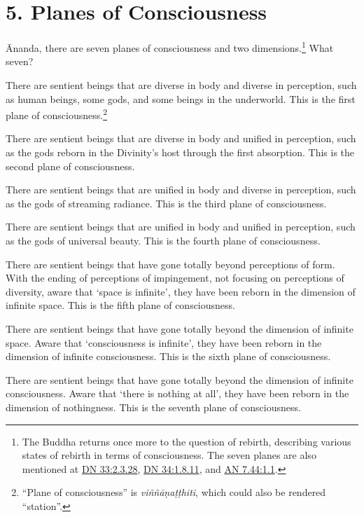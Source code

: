 \documentclass[12pt,openany]{book}%
\begin{document}
\section*{5. Planes of Consciousness }

Ānanda, there are seven planes of consciousness and two dimensions.\footnote{The Buddha returns once more to the question of rebirth, describing various states of rebirth in terms of consciousness. The seven planes are also mentioned at \href{https://suttacentral.net/dn33/en/sujato\#2.3.28}{DN 33:2.3.28}, \href{https://suttacentral.net/dn34/en/sujato\#1.8.11}{DN 34:1.8.11}, and \href{https://suttacentral.net/an7.44/en/sujato\#1.1}{AN 7.44:1.1}. } What seven? 

There are sentient beings that are diverse in body and diverse in perception, such as human beings, some gods, and some beings in the underworld. This is the first plane of consciousness.\footnote{“Plane of consciousness” is \textit{\textsanskrit{viññāṇaṭṭhiti}}, which could also be rendered “station”. } 

There are sentient beings that are diverse in body and unified in perception, such as the gods reborn in the Divinity’s host through the first absorption. This is the second plane of consciousness. 

There are sentient beings that are unified in body and diverse in perception, such as the gods of streaming radiance. This is the third plane of consciousness. 

There are sentient beings that are unified in body and unified in perception, such as the gods of universal beauty. This is the fourth plane of consciousness. 

There are sentient beings that have gone totally beyond perceptions of form. With the ending of perceptions of impingement, not focusing on perceptions of diversity, aware that ‘space is infinite’, they have been reborn in the dimension of infinite space. This is the fifth plane of consciousness. 

There are sentient beings that have gone totally beyond the dimension of infinite space. Aware that ‘consciousness is infinite’, they have been reborn in the dimension of infinite consciousness. This is the sixth plane of consciousness. 

There are sentient beings that have gone totally beyond the dimension of infinite consciousness. Aware that ‘there is nothing at all’, they have been reborn in the dimension of nothingness. This is the seventh plane of consciousness. 
\end{document}
